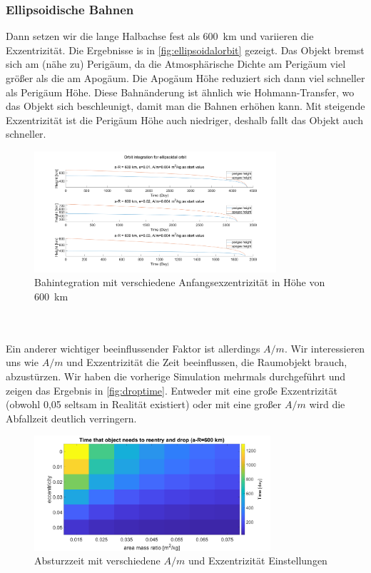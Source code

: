 \documentclass{article}
\begin{document}
\subsubsection{Ellipsoidische Bahnen}
Dann setzen wir die lange Halbachse fest als \SI{600}{\kilo\meter} und variieren die Exzentrizität. Die Ergebnisse is in \autoref{fig:ellipsoidalorbit} gezeigt. Das Objekt bremst sich am (nähe zu) Perigäum, da die Atmosphärische Dichte am Perigäum viel größer als die am Apogäum. Die Apogäum Höhe reduziert sich dann viel schneller als Perigäum Höhe. Diese Bahnänderung ist ähnlich wie Hohmann-Transfer, wo das Objekt sich beschleunigt, damit man die Bahnen erhöhen kann. Mit steigende Exzentrizität ist die Perigäum Höhe auch niedriger, deshalb fallt das Objekt auch schneller.
\begin{figure}[ht]\centering 
	\includegraphics[width=0.8\textwidth]{images/inte_change_e.png}
	\caption{Bahintegration mit verschiedene Anfangsexzentrizität in Höhe von \SI{600}{\kilo\meter}}
	\label{fig:ellipsoidalorbit}
\end{figure}
\\\\
Ein anderer wichtiger beeinflussender Faktor ist allerdings $A/m$. Wir interessieren uns wie $A/m$ und Exzentrizität die Zeit beeinflussen, die Raumobjekt brauch, abzustürzen. Wir haben die vorherige Simulation mehrmals durchgeführt und zeigen das Ergebnis in \autoref{fig:droptime}. Entweder mit eine große Exzentrizität (obwohl 0,05 seltsam in Realität existiert) oder mit eine großer $A/m$ wird die Abfallzeit deutlich verringern.
\begin{figure}[ht]\centering 
	\includegraphics[width=0.78\textwidth]{images/drop_time_600.png}
	\caption{Absturzzeit mit verschiedene $A/m$ und Exzentrizität Einstellungen}
	\label{fig:droptime}
\end{figure}
\end{document}
